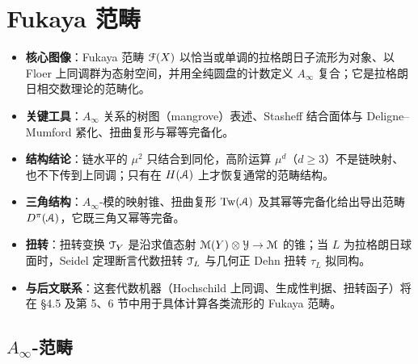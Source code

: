 
\section{Fukaya 范畴}\label{Sec:Fukaya}

\begin{keypoints}
\begin{itemize}
  \item \textbf{核心图像}：Fukaya 范畴 $\EuScript{F}(X)$ 以恰当或单调的拉格朗日子流形为对象、以 Floer 上同调群为态射空间，并用全纯圆盘的计数定义 $A_{\infty}$ 复合；它是拉格朗日相交数理论的范畴化。
  \item \textbf{关键工具}：$A_{\infty}$ 关系的树图（mangrove）表述、Stasheff 结合面体与 Deligne--Mumford 紧化、扭曲复形与幂等完备化。
  \item \textbf{结构结论}：链水平的 $\mu^2$ 只结合到同伦，高阶运算 $\mu^d$（$d\ge 3$）不是链映射、也不下传到上同调；只有在 $H(\EuScript{A})$ 上才恢复通常的范畴结构。
  \item \textbf{三角结构}：$A_{\infty}$-模的映射锥、扭曲复形 $\operatorname{Tw}(\EuScript{A})$ 及其幂等完备化给出导出范畴 $D^\pi(\EuScript{A})$，它既三角又幂等完备。
  \item \textbf{扭转}：扭转变换 $\EuScript{T}_Y$ 是沿求值态射 $\EuScript{M}(Y)\otimes\EuScript{Y}\to\EuScript{M}$ 的锥；当 $L$ 为拉格朗日球面时，Seidel 定理断言代数扭转 $\EuScript{T}_L$ 与几何正 Dehn 扭转 $\tau_L$ 拟同构。
  \item \textbf{与后文联系}：这套代数机器（Hochschild 上同调、生成性判据、扭转函子）将在 §4.5 及第 5、6 节中用于具体计算各类流形的 Fukaya 范畴。
\end{itemize}
\end{keypoints}

\subsection{$A_{\infty}$-范畴}

